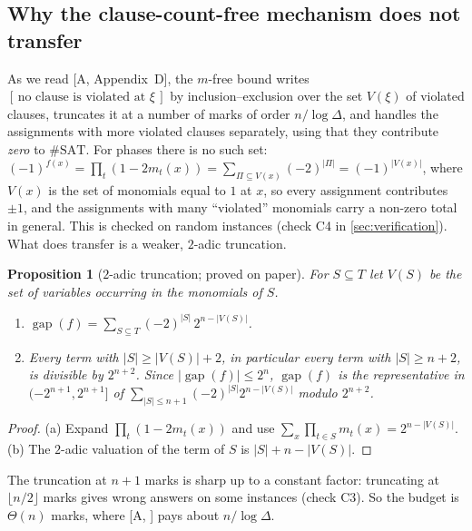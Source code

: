 \documentclass[10pt]{amsart}
\theoremstyle{plain}
\newtheorem{proposition}[theorem]{Proposition}
\theoremstyle{definition}
\theoremstyle{remark}
\numberwithin{equation}{section}
\newcommand{\gap}{\operatorname{gap}}
\newcommand{\Ind}[1]{[\,#1\,]}
\newcommand{\A}[1][]{\textup{[A\if\relax\detokenize{#1}\relax\else, #1\fi]}}
\begin{document}
\subsection{Why the clause-count-free mechanism does not transfer}
As we read \A[Appendix~D], the $m$-free bound writes $\Ind{\text{no clause is violated at }\xi}$
by inclusion--exclusion over the set $V(\xi)$ of violated clauses, truncates it at a number of
marks of order $n/\log\Delta$, and handles the assignments with more violated clauses separately,
using that they contribute \emph{zero} to $\#\mathrm{SAT}$. For phases there is no such set:
$(-1)^{f(x)}=\prod_t(1-2m_t(x))=\sum_{\Pi\subseteq V(x)}(-2)^{|\Pi|}=(-1)^{|V(x)|}$, where $V(x)$ is
the set of monomials equal to $1$ at $x$, so every assignment contributes $\pm1$, and the
assignments with many ``violated'' monomials carry a non-zero total in general. This is checked
on random instances (check C4 in \cref{sec:verification}). What does transfer is a weaker,
$2$-adic truncation.

\begin{proposition}[$2$-adic truncation; proved on paper]\label{prop:2adic}
For $S\subseteq T$ let $V(S)$ be the set of variables occurring in the monomials of $S$.
\begin{enumerate}[label=\textup{(\alph*)}]
\item $\gap(f)=\sum_{S\subseteq T}(-2)^{|S|}\,2^{n-|V(S)|}$.
\item Every term with $|S|\ge|V(S)|+2$, in particular every term with $|S|\ge n+2$, is divisible by
$2^{n+2}$. Since $|\gap(f)|\le2^n$, $\gap(f)$ is the representative in $(-2^{n+1},2^{n+1}]$ of
$\sum_{|S|\le n+1}(-2)^{|S|}2^{n-|V(S)|}$ modulo $2^{n+2}$.
\end{enumerate}
\end{proposition}

\begin{proof}
(a) Expand $\prod_t(1-2m_t(x))$ and use $\sum_x\prod_{t\in S}m_t(x)=2^{n-|V(S)|}$. (b) The $2$-adic
valuation of the term of $S$ is $|S|+n-|V(S)|$.
\end{proof}

The truncation at $n+1$ marks is sharp up to a constant factor: truncating at $\lfloor n/2\rfloor$
marks gives wrong answers on some instances (check C3). So the budget is $\Theta(n)$ marks, where
\A{} pays about $n/\log\Delta$.
\end{document}
